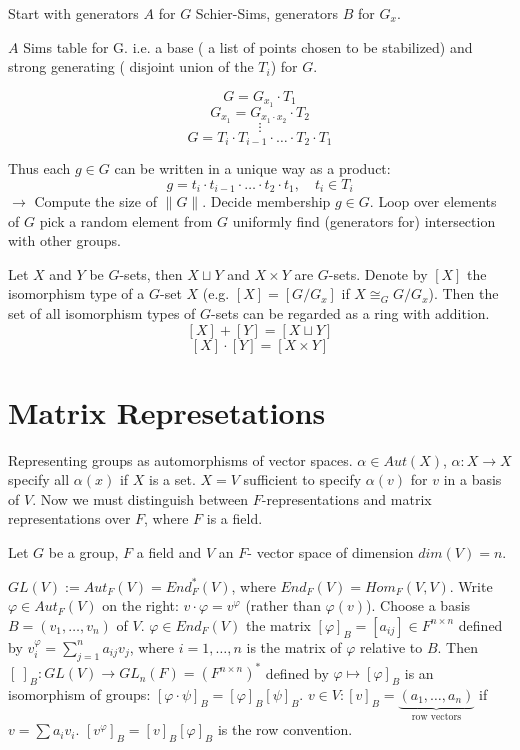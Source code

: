 \documentclass[12pt]{amsart}
\theoremstyle{definition}
\begin{document}
Start with generators $A$ for $G$ Schier-Sims, generators $B$ for $G_{x}$.

$A$ Sims table for G. i.e. a base ( a list of points chosen to be stabilized) and strong generating ( disjoint union of the $T_{i}$) for $G$.

$$G = G_{x_{1}} \cdot T_{1}$$
$$G_{x_{1}} = G_{x_{1} \cdot x_{2}} \cdot T_{2}$$
$$ \vdots$$
$$G = T_{i} \cdot T_{i - 1} \cdot \ldots \cdot T_{2} \cdot T_{1}$$

Thus each $g \in G$ can be written in a unique way as a product:
$$g = t_{i} \cdot t_{i - 1} \cdot \ldots \cdot t_{2} \cdot t_{1}, \quad t_{i} \in T_{i}$$
 $\rightarrow$ Compute the size of $\| G \|$. Decide membership $g \in G$. Loop over elements of $G$ pick a random element from $G$ uniformly find (generators for) intersection with other groups.

Let $X$ and $Y$ be $G$-sets, then $X \sqcup Y$ and $X \times Y$ are $G$-sets. Denote by $[X]$ the isomorphism type of a $G$-set $X$ (e.g. $[X] = [G/G_{x}]$ if $X \cong_{G} G/G_{x}$). Then the set of all isomorphism types of $G$-sets can be regarded as a ring with addition. $$[X] + [Y] = [X \sqcup Y]$$ $$[X] \cdot [Y] = [ X \times Y]$$

\section{Matrix Represetations}

Representing groups as automorphisms of vector spaces. $\alpha \in Aut(X)$, $\alpha: X \rightarrow X$ specify all $\alpha (x)$ if $X$ is a set. $X = V$ sufficient to specify $\alpha (v)$ for $v$ in a basis of $V$. Now we must distinguish between $F$-representations and matrix representations over $F$, where $F$ is a field.

Let $G$ be a group, $F$ a field and $V$ an $F$- vector space of dimension $dim(V) = n$.

$GL(V) := Aut_{F} (V) = End_{F}^{\ast} (V)$, where $End_{F} (V) = Hom_{F} (V, V)$. Write $\varphi \in Aut_{F} (V)$ on the right: $v \cdot \varphi = v^{\varphi}$ (rather than $\varphi (v)$). Choose a basis $B = \left( v_{1}, \ldots, v_{n} \right)$ of $V$. $\varphi \in End_{F} (V)$ the matrix $[ \varphi ]_{B} = [ a_{i j} ] \in F^{n \times n}$ defined by $v_{i}^{\varphi}  = \sum_{j = 1}^{n} {a_{ij}}{v_{j}}$, where $i = 1, \ldots, n$ is the matrix of $\varphi$ relative to $B$. Then $[ \  ]_{B} : GL(V) \rightarrow GL_{n} (F) = \left( F^{n \times n} \right)^{\ast}$ defined by $\varphi \mapsto [ \varphi ]_{B}$ is an isomorphism of groups: $[ \varphi \cdot \psi ]_{B} = [ \varphi ]_{B} [ \psi ]_{B}$. $v \in V: [ v ]_{B} = \underbrace{\left( a_{1}, \ldots, a_{n} \right)}_{\text{row vectors}}$ if $v = \sum{a_{i}}{v_{i}}$. $\left[ v^{\varphi} \right]_{B} = [v]_{B} [ \varphi ]_{B}$ is the row convention.
\end{document}
